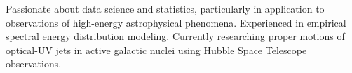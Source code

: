 %
%
%

\par{
	Passionate about data science and statistics, particularly in application to observations of high-energy astrophysical phenomena. Experienced in empirical spectral energy distribution modeling. Currently researching proper motions of optical-UV jets in active galactic nuclei using Hubble Space Telescope observations.%
}

